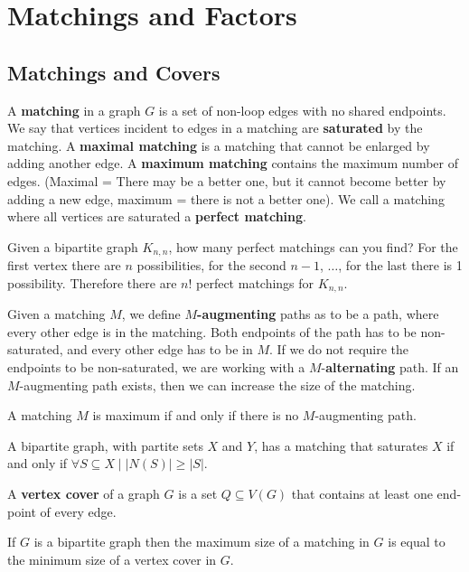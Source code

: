 \chapter{Matchings and Factors}

\section{Matchings and Covers}%
\label{sec:3.1}

A \textbf{matching} in a graph $G$ is a set of non-loop edges with no shared endpoints. We say that vertices incident to edges in a matching are \textbf{saturated} by the matching. A \textbf{maximal matching} is a matching that cannot be enlarged by adding another edge. A \textbf{maximum matching} contains the maximum number of edges. (Maximal = There may be a better one, but it cannot become better by adding a new edge, maximum = there is not a better one). We call a matching where all vertices are saturated a \textbf{perfect matching}.

Given a bipartite graph $K_{n,n}$, how many perfect matchings can you find? For the first vertex there are $n$ possibilities, for the second $n-1$, $\ldots$, for the last there is 1 possibility. Therefore there are $n!$ perfect matchings for $K_{n,n}$.

Given a matching $M$, we define $M$\textbf{-augmenting} paths as to be a path, where every other edge is in the matching. Both endpoints of the path has to be non-saturated, and every other edge has to be in $M$. If we do not require the endpoints to be non-saturated, we are working with a $M$-\textbf{alternating} path. If an $M$-augmenting path exists, then we can increase the size of the matching.

\begin{theorem}[Berge, 1957]
	A matching $M$ is maximum if and only if there is no $M$-augmenting path.
\end{theorem}

\begin{theorem}[Hall, 1935]
	A bipartite graph, with partite sets $X$ and $Y$, has a matching that saturates $X$ if and only if $\forall S \subseteq X \mid |N(S)| \ge |S|$.
\end{theorem}

A \textbf{vertex cover} of a graph $G$ is a set $Q \subseteq V(G)$ that contains at least one end-point of every edge.

\begin{theorem}
	If $G$ is a bipartite graph then the maximum size of a matching in $G$ is equal to the minimum size of a vertex cover in $G$.
\end{theorem}

